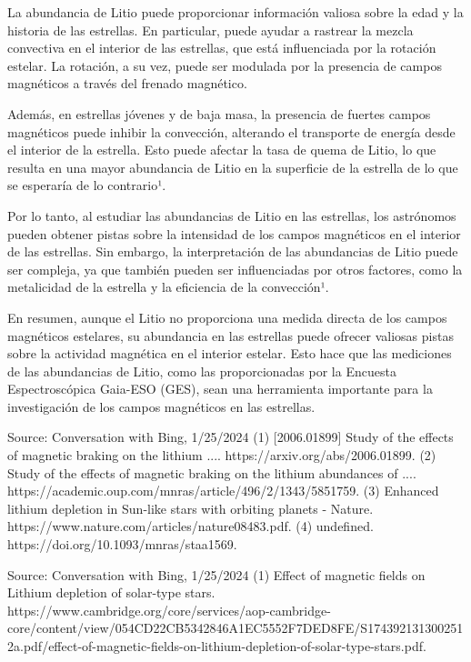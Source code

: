La abundancia de Litio puede proporcionar información valiosa sobre la edad y la historia de las estrellas. En particular, puede ayudar a rastrear la mezcla convectiva en el interior de las estrellas, que está influenciada por la rotación estelar. La rotación, a su vez, puede ser modulada por la presencia de campos magnéticos a través del frenado magnético.

Además, en estrellas jóvenes y de baja masa, la presencia de fuertes campos magnéticos puede inhibir la convección, alterando el transporte de energía desde el interior de la estrella. Esto puede afectar la tasa de quema de Litio, lo que resulta en una mayor abundancia de Litio en la superficie de la estrella de lo que se esperaría de lo contrario¹.

Por lo tanto, al estudiar las abundancias de Litio en las estrellas, los astrónomos pueden obtener pistas sobre la intensidad de los campos magnéticos en el interior de las estrellas. Sin embargo, la interpretación de las abundancias de Litio puede ser compleja, ya que también pueden ser influenciadas por otros factores, como la metalicidad de la estrella y la eficiencia de la convección¹.

En resumen, aunque el Litio no proporciona una medida directa de los campos magnéticos estelares, su abundancia en las estrellas puede ofrecer valiosas pistas sobre la actividad magnética en el interior estelar. Esto hace que las mediciones de las abundancias de Litio, como las proporcionadas por la Encuesta Espectroscópica Gaia-ESO (GES), sean una herramienta importante para la investigación de los campos magnéticos en las estrellas.

Source: Conversation with Bing, 1/25/2024
(1) [2006.01899] Study of the effects of magnetic braking on the lithium .... https://arxiv.org/abs/2006.01899.
(2) Study of the effects of magnetic braking on the lithium abundances of .... https://academic.oup.com/mnras/article/496/2/1343/5851759.
(3) Enhanced lithium depletion in Sun-like stars with orbiting planets - Nature. https://www.nature.com/articles/nature08483.pdf.
(4) undefined. https://doi.org/10.1093/mnras/staa1569.

Source: Conversation with Bing, 1/25/2024
(1) Effect of magnetic fields on Lithium depletion of solar-type stars. https://www.cambridge.org/core/services/aop-cambridge-core/content/view/054CD22CB5342846A1EC5552F7DED8FE/S1743921313002512a.pdf/effect-of-magnetic-fields-on-lithium-depletion-of-solar-type-stars.pdf.




